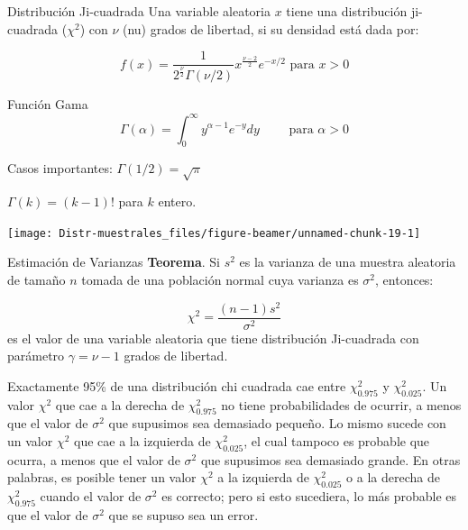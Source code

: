\documentclass[
  10pt,
  ignorenonframetext,
]{beamer}
\begin{document}
\begin{frame}{}
\protect\hypertarget{section-52}{}
\begin{block}{Distribución Ji-cuadrada}
\protect\hypertarget{distribuciuxf3n-ji-cuadrada}{}
Una variable aleatoria \(x\) tiene una distribución ji-cuadrada
(\(\chi^2\)) con \(\nu\) (nu) grados de libertad, si su densidad está
dada por:

\[f(x)=\frac{1}{2^{\frac{\nu}{2}}\Gamma(\nu/2)}x^{\frac{\nu-2}{2}}e^{-x/2} \mbox{ para } x>0\]
\end{block}

\begin{block}{Función Gama}
\protect\hypertarget{funciuxf3n-gama}{}
\[\Gamma(\alpha)=\int_0^\infty y^{\alpha -1}e^{-y}dy \qquad \mbox{ para } \alpha >0\]

Casos importantes: \(\Gamma(1/2)=\sqrt{\pi}\)

\(\Gamma(k)= (k-1)!\) para \(k\) entero.
\end{block}
\end{frame}

\begin{frame}{}
\protect\hypertarget{section-53}{}
\begin{center}\texttt{[image: Distr-muestrales\_files/figure-beamer/unnamed-chunk-19-1]} \end{center}
\end{frame}

\begin{frame}{}
\protect\hypertarget{section-54}{}
\begin{block}{Estimación de Varianzas}
\protect\hypertarget{estimaciuxf3n-de-varianzas}{}
\textbf{Teorema}. Si \(s^2\) es la varianza de una muestra aleatoria de
tamaño \(n\) tomada de una población normal cuya varianza es
\(\sigma^2\), entonces:

\[\chi^2=\frac{(n-1)s^2}{\sigma^2}\] es el valor de una variable
aleatoria que tiene distribución Ji-cuadrada con parámetro
\(\gamma = \nu - 1\) grados de libertad.

\bigskip

Exactamente 95\% de una distribución chi cuadrada cae entre
\(\chi_{0.975}^2\) y \(\chi_{0.025}^2\). Un valor \(\chi^2\) que cae a
la derecha de \(\chi_{0.975}^2\) no tiene probabilidades de ocurrir, a
menos que el valor de \(\sigma^2\) que supusimos sea demasiado pequeño.
Lo mismo sucede con un valor \(\chi^2\) que cae a la izquierda de
\(\chi_{0.025}^2\), el cual tampoco es probable que ocurra, a menos que
el valor de \(\sigma^2\) que supusimos sea demasiado grande. En otras
palabras, es posible tener un valor \(\chi^2\) a la izquierda de
\(\chi_{0.025}^2\) o a la derecha de \(\chi_{0.975}^2\) cuando el valor
de \(\sigma^2\) es correcto; pero si esto sucediera, lo más probable es
que el valor de \(\sigma^2\) que se supuso sea un error.
\end{block}
\end{frame}
\end{document}
